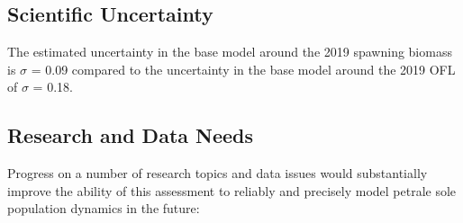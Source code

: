 \documentclass[12pt,]{article}
\begin{document}
\FloatBarrier

\subsection*{Scientific Uncertainty}\label{scientific-uncertainty}

The estimated uncertainty in the base model around the 2019 spawning
biomass is \(\sigma\) = 0.09 compared to the uncertainty in the base
model around the 2019 OFL of \(\sigma\) = 0.18.

\subsection*{Research and Data Needs}\label{research-and-data-needs}

Progress on a number of research topics and data issues would
substantially improve the ability of this assessment to reliably and
precisely model petrale sole population dynamics in the future:
\end{document}
